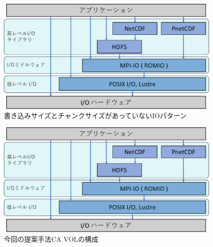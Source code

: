 \documentclass[submit,techrep,noauthor]{ipsj}
\begin{document}
\begin{figure}[t]
	\centering
	\includegraphics[page=15,width=\linewidth]{figure-crop.pdf}
	\caption{書き込みサイズとチャンクサイズがあっていないIOパターン}
	\label{fig:correctio}
\end{figure}

\begin{figure}[t]
	\centering
	\includegraphics[page=8,width=\linewidth]{figure-crop.pdf}
	\caption{今回の提案手法CA VOLの構成}
	\label{fig:dividevol}
\end{figure}
\end{document}

